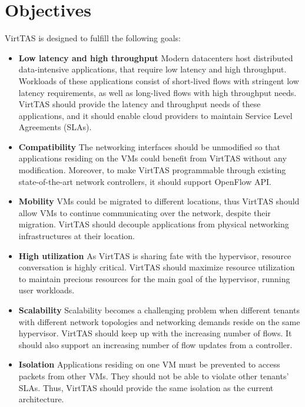 
\section{Objectives}
VirtTAS is designed to fulfill the following goals:

\begin{itemize}
    \item \textbf{Low latency and high throughput} %
    Modern datacenters host distributed data-intensive applications, that require low latency and high throughput. Workloads of these applications consist of short-lived flows with stringent low latency requirements, as well as long-lived flows with high throughput needs. VirtTAS should provide the latency and throughput needs of these applications, and it should enable cloud providers to maintain Service Level Agreements (SLAs). 
    
    \item \textbf{Compatibility} %
    The networking interfaces should be unmodified so that applications residing on the VMs could benefit from VirtTAS without any modification.
    Moreover, to make VirtTAS programmable through existing state-of-the-art network controllers, it should support OpenFlow API.
    \item \textbf{Mobility} %
    VMs could be migrated to different locations, thus VirtTAS should allow VMs to continue communicating over the network, despite their migration. VirtTAS should decouple applications from physical networking infrastructures at their location.
    \item \textbf{High utilization}
    As VirtTAS is sharing fate with the hypervisor, resource conversation is highly critical. VirtTAS should maximize resource utilization to maintain precious resources for the main goal of the hypervisor, running user workloads.
    \item \textbf{Scalability} %
    Scalability becomes a challenging problem when different tenants with different network topologies and networking demands reside on the same hypervisor. VirtTAS should keep up with the increasing number of flows. It should also support an increasing number of flow updates from a controller.
    \item \textbf{Isolation} 
    Applications residing on one VM must be prevented to access packets from other VMs. They should not be able to violate other tenants' SLAs. Thus, VirtTAS should provide the same isolation as the current architecture.
\end{itemize}



